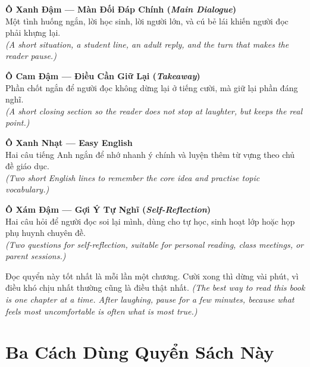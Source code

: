 \begin{tcolorbox}[
  colback=booksecondary!8,
  colframe=booksecondary!70!black,
  coltitle=black,
  fonttitle=\bfseries,
  title={Giải Thích Các Ô Trong Sách \quad\textit{\small(Book Guide)}},
  arc=4pt, boxrule=1pt, breakable, enhanced
]

\smallskip
\textbf{Ô Xanh Đậm --- Màn Đối Đáp Chính (\textit{Main Dialogue})}\\
Một tình huống ngắn, lời học sinh, lời người lớn, và cú bẻ lái khiến người đọc phải khựng lại.\\
\textit{(A short situation, a student line, an adult reply, and the turn that makes the reader pause.)}

\medskip
\textbf{Ô Cam Đậm --- Điều Cần Giữ Lại (\textit{Takeaway})}\\
Phần chốt ngắn để người đọc không dừng lại ở tiếng cười, mà giữ lại phần đáng nghĩ.\\
\textit{(A short closing section so the reader does not stop at laughter, but keeps the real point.)}

\medskip
\textbf{Ô Xanh Nhạt --- Easy English}\\
Hai câu tiếng Anh ngắn để nhớ nhanh ý chính và luyện thêm từ vựng theo chủ đề giáo dục.\\
\textit{(Two short English lines to remember the core idea and practise topic vocabulary.)}

\medskip
\textbf{Ô Xám Đậm --- Gợi Ý Tự Nghĩ (\textit{Self-Reflection})}\\
Hai câu hỏi để người đọc soi lại mình, dùng cho tự học, sinh hoạt lớp hoặc họp phụ huynh chuyên đề.\\
\textit{(Two questions for self-reflection, suitable for personal reading, class meetings, or parent sessions.)}

\smallskip
\end{tcolorbox}

\vspace{6pt}

\begin{baihoc}
Đọc quyển này tốt nhất là mỗi lần một chương. Cười xong thì dừng vài phút, vì điều khó chịu nhất thường cũng là điều thật nhất.
\textit{(The best way to read this book is one chapter at a time. After laughing, pause for a few minutes, because what feels most uncomfortable is often what is most true.)}
\end{baihoc}

\section*{Ba Cách Dùng Quyển Sách Này}


